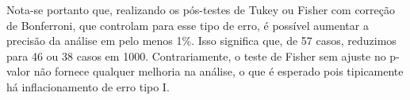 \documentclass[
]{article}
\begin{document}
Nota-se portanto que, realizando os pós-testes de Tukey ou Fisher com
correção de Bonferroni, que controlam para esse tipo de erro, é possível
aumentar a precisão da análise em pelo menos 1\%. Isso significa que, de
57 casos, reduzimos para 46 ou 38 casos em 1000. Contrariamente, o teste
de Fisher sem ajuste no p-valor não fornece qualquer melhoria na
análise, o que é esperado pois tipicamente há inflacionamento de erro
tipo I.
\end{document}
